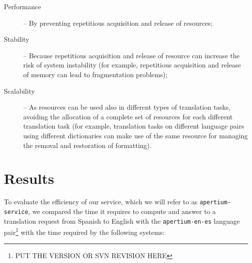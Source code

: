 \documentclass[11pt]{article}
\begin{document}
\begin{description}
 \item[Performance] -- By preventing repetitious acquisition and release of resources;
 \item[Stability] -- Because repetitious acquisition and release of resource can 
        increase the risk of system instability (for example, repetitious acquisition and 
        release of memory can lead to fragmentation problems); %




 \item[Scalability] -- As resources can be used also in different types of translation tasks, 
        avoiding the allocation of a complete set of resources for each different translation 
        task (for example, translation tasks on different language pairs using different 
        dictionaries can make use of the same resource for managing the removal and restoration 
        of formatting).
\end{description}

\section{Results}

To evaluate the efficiency of our service, which we will refer to as {\tt apertium-service}, we 
compared the time it requires to compute and answer to a translation request from Spanish 
to English with the {\tt\small apertium-en-es} language pair\footnote{PUT THE VERSION OR SVN 
REVISION HERE} with the time required by the following systems:
\end{document}
